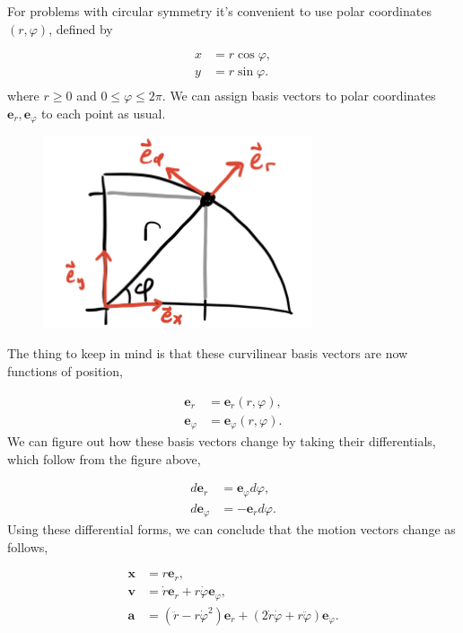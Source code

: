 \documentclass[
  letterpaper,
  DIV=11,
  numbers=noendperiod]{scrreprt}
\begin{document}
For problems with circular symmetry it's convenient to use polar
coordinates \((r,\varphi)\), defined by

\[
\begin{align*} 
x &=  r\cos\varphi, \\ 
y &=  r\sin\varphi. \\
\end{align*}
\] where \(r \geq 0\) and \(0 \leq \varphi \leq 2\pi\). We can assign
basis vectors to polar coordinates \(\mathbf{e}_r, \mathbf{e}_\varphi\)
to each point as usual.

\begin{figure}

{\centering \includegraphics[width=3.125in,height=\textheight]{classical-mechanics/./resources/image-20230212040057533.png}

}

\end{figure}

The thing to keep in mind is that these curvilinear basis vectors are
now functions of position,

\[
\begin{align*} 
\mathbf{e}_r &= \mathbf{e}_r(r, \varphi), \\ 
\mathbf{e}_\varphi &= \mathbf{e}_\varphi(r, \varphi). 
\end{align*}
\] We can figure out how these basis vectors change by taking their
differentials, which follow from the figure above,

\[
\begin{align*} 
d\mathbf{e}_r &= \mathbf{e}_\varphi d\varphi, \\ 
d\mathbf{e}_\varphi &= -\mathbf{e}_r d\varphi.
\end{align*}
\] Using these differential forms, we can conclude that the motion
vectors change as follows,

\[
\begin{align*}
\mathbf{x} &= r\mathbf{e}_r, \\
\mathbf{v} &= \dot r \mathbf{e}_r + r\dot \varphi \mathbf{e}_\varphi, \\
\mathbf{a} &= (\ddot r - r\dot \varphi^2)\mathbf{e}_r + (2\dot r \dot \varphi + r\ddot \varphi)\mathbf{e}_\varphi.
\end{align*}
\]
\end{document}
